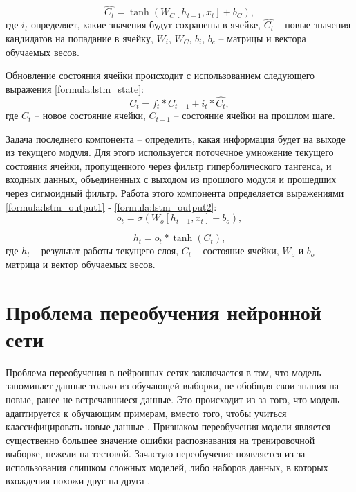 \begin{equation}\label{formula:lstm_input2}
	\hat{C_t} = \tanh(W_C[h_{t-1}, x_t] + b_C),
\end{equation}
где $i_t$ определяет, какие значения будут сохранены в ячейке, $\hat{C_t}$ -- новые значения кандидатов на попадание в ячейку, $W_i$, $W_C$, $b_i$, $b_c$ -- матрицы и вектора обучаемых весов.

Обновление состояния ячейки происходит с использованием следующего выражения \ref{formula:lstm_state}:
\begin{equation}\label{formula:lstm_state}
	C_t = f_t * C_{t-1} + i_t*\hat{C_t},
\end{equation}
где $C_t$ -- новое состояние ячейки, $C_{t-1}$ -- состояние ячейки на прошлом шаге.

Задача последнего компонента -- определить, какая информация будет на выходе из текущего модуля.
Для этого используется поточечное умножение текущего состояния ячейки, пропущенного через фильтр гиперболического тангенса, и входных данных, объединенных с выходом из прошлого модуля и прошедших через сигмоидный фильтр.
Работа этого компонента определяется выражениями \ref{formula:lstm_output1} - \ref{formula:lstm_output2}:
\begin{equation}\label{formula:lstm_output1}
	o_t = \sigma(W_o[h_{t-1}, x_t] + b_o),
\end{equation}

\begin{equation}\label{formula:lstm_output2}
	h_t = o_t * \tanh(C_t),
\end{equation}
где $h_t$ -- результат работы текущего слоя, $C_t$ -- состояние ячейки, $W_o$ и $b_o$ -- матрица и вектор обучаемых весов.


\section{Проблема переобучения нейронной сети}\label{sec:retraining}
Проблема переобучения в нейронных сетях заключается в том, что модель запоминает данные только из обучающей выборки, не обобщая свои знания на новые, ранее не встречавшиеся данные. Это происходит из-за того, что модель адаптируется к обучающим примерам, вместо того, чтобы учиться классифицировать новые данные \cite{overtraining1}. Признаком переобучения модели является существенно большее значение ошибки распознавания на тренировочной выборке, нежели на тестовой. Зачастую переобучение появляется из-за использования слишком сложных моделей, либо наборов данных, в которых вхождения похожи друг на друга \cite{overtraining1}.

